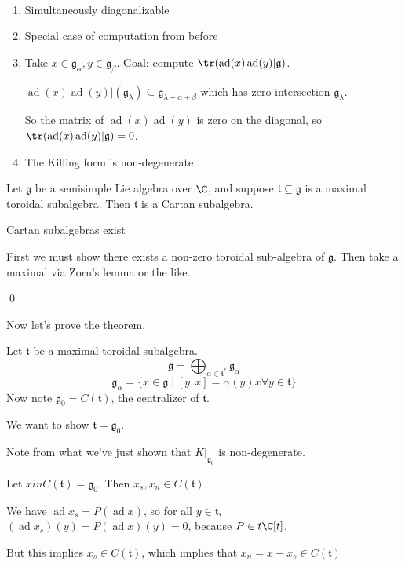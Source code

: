 \documentclass[x11names,reqno,14pt]{extarticle}
\newcommand{\mk}[1]{\mathfrak{#1}}
\newcommand{\g}{\mk{g}}
\DeclareMathOperator{\ad}{ad}
\begin{document}
\proof
\,
\begin{enumerate}

\item Simultaneously diagonalizable 

\item Special case of computation from before

\item Take $x \in \g_\alpha, y \in \g_\beta$. Goal: compute $\tr(\ad(x)\ad(y)|\g)$. 

$\ad(x)\ad(y)|(\g_\lambda) \subseteq \g_{\lambda+\alpha+\beta}$ which has zero intersection $\g_\lambda$. 

So the matrix of $\ad(x)\ad(y)$ is zero on the diagonal, so $\tr(\ad(x)\ad(y)|\g) = 0$. 

\item The Killing form is non-degenerate. 

\end{enumerate}

\thm

Let $\g$ be a semisimple Lie algebra over $\C$, and suppose $\mk{t}\subseteq\g$ is a maximal toroidal subalgebra. Then $\mk{t}$ is a Cartan subalgebra. 

\cor

Cartan subalgebras exist

\proof

First we must show there exists a non-zero toroidal sub-algebra of $\g$. Then take a maximal via Zorn's lemma or the like. 

\qed

\proof

Now let's prove the theorem. 

Let $\mk{t}$ be a maximal toroidal subalgebra. 
\[
\g = \bigoplus_{\alpha\in\mk{t}^*}\g_\alpha
\]
\[
\g_\alpha = \{x\in \g \mid [y,x] = \alpha(y)x\forall y \in \mk{t}\}
\]
Now note $\g_0 = C(\mk{t})$, the centralizer of $\mk{t}$. 

We want to show $\mk{t} = \g_0$. 

Note from what we've just shown that $K|_{\g_0}$ is non-degenerate. 

\claim 

Let $x in C(\mk{t}) = \g_0$. Then $x_s, x_n \in C(\mk{t})$. 

\proof

We have $\ad x_s = P(\ad x)$, so for all $y \in \mk{t}$, $(\ad x_s)(y) = P(\ad x)(y) = 0$, because $P \in t\C[t]$. 

But this implies $x_s \in C(\mk{t})$, which implies that $x_n = x - x_s \in C(\mk{t})$
\end{document}
